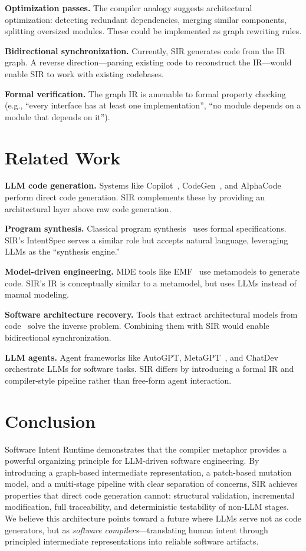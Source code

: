 \documentclass[11pt,a4paper]{article}
\begin{document}
\textbf{Optimization passes.} The compiler analogy suggests architectural optimization: detecting redundant dependencies, merging similar components, splitting oversized modules. These could be implemented as graph rewriting rules.

\textbf{Bidirectional synchronization.} Currently, SIR generates code from the IR graph. A reverse direction---parsing existing code to reconstruct the IR---would enable SIR to work with existing codebases.

\textbf{Formal verification.} The graph IR is amenable to formal property checking (e.g., ``every interface has at least one implementation'', ``no module depends on a module that depends on it'').

\section{Related Work}

\textbf{LLM code generation.} Systems like Copilot~\citep{chen2021evaluating}, CodeGen~\citep{nijkamp2023codegen}, and AlphaCode~\citep{li2022alphacode} perform direct code generation. SIR complements these by providing an architectural layer above raw code generation.

\textbf{Program synthesis.} Classical program synthesis~\citep{gulwani2017program} uses formal specifications. SIR's IntentSpec serves a similar role but accepts natural language, leveraging LLMs as the ``synthesis engine.''

\textbf{Model-driven engineering.} MDE tools like EMF~\citep{steinberg2008emf} use metamodels to generate code. SIR's IR is conceptually similar to a metamodel, but uses LLMs instead of manual modeling.

\textbf{Software architecture recovery.} Tools that extract architectural models from code~\citep{garcia2013comparative} solve the inverse problem. Combining them with SIR would enable bidirectional synchronization.

\textbf{LLM agents.} Agent frameworks like AutoGPT, MetaGPT~\citep{hong2023metagpt}, and ChatDev~\citep{qian2024chatdev} orchestrate LLMs for software tasks. SIR differs by introducing a formal IR and compiler-style pipeline rather than free-form agent interaction.

\section{Conclusion}

Software Intent Runtime demonstrates that the compiler metaphor provides a powerful organizing principle for LLM-driven software engineering. By introducing a graph-based intermediate representation, a patch-based mutation model, and a multi-stage pipeline with clear separation of concerns, SIR achieves properties that direct code generation cannot: structural validation, incremental modification, full traceability, and deterministic testability of non-LLM stages. We believe this architecture points toward a future where LLMs serve not as code generators, but as \emph{software compilers}---translating human intent through principled intermediate representations into reliable software artifacts.
\end{document}
